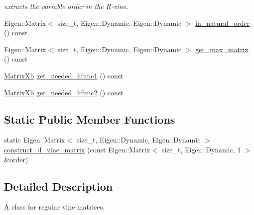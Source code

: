 \begin{DoxyCompactItemize}
\begin{DoxyCompactList}\small\item\em extracts the variable order in the R-\/vine. \end{DoxyCompactList}\item 
Eigen\+::\+Matrix$<$ size\+\_\+t, Eigen\+::\+Dynamic, Eigen\+::\+Dynamic $>$ \hyperlink{classvinecopulib_1_1_r_vine_matrix_a4e63d8b01e1d89284ca28192676b8a3f}{in\+\_\+natural\+\_\+order} () const 
\item 
Eigen\+::\+Matrix$<$ size\+\_\+t, Eigen\+::\+Dynamic, Eigen\+::\+Dynamic $>$ \hyperlink{classvinecopulib_1_1_r_vine_matrix_aef8bbe14451d023e1c9c113e3812f574}{get\+\_\+max\+\_\+matrix} () const 
\item 
\hyperlink{namespacetools__eigen_ad496806a2d02c8e881330d95e0c150aa}{Matrix\+Xb} \hyperlink{classvinecopulib_1_1_r_vine_matrix_a6303fc1f643fdf793c867ca7e08e42bc}{get\+\_\+needed\+\_\+hfunc1} () const 
\item 
\hyperlink{namespacetools__eigen_ad496806a2d02c8e881330d95e0c150aa}{Matrix\+Xb} \hyperlink{classvinecopulib_1_1_r_vine_matrix_a7ac32cf10a966ba567142e9b36106746}{get\+\_\+needed\+\_\+hfunc2} () const 
\end{DoxyCompactItemize}
\subsection*{Static Public Member Functions}
\begin{DoxyCompactItemize}
\item 
static Eigen\+::\+Matrix$<$ size\+\_\+t, Eigen\+::\+Dynamic, Eigen\+::\+Dynamic $>$ \hyperlink{classvinecopulib_1_1_r_vine_matrix_ad523b84e2ea41eba4eb982eb9b39471b}{construct\+\_\+d\+\_\+vine\+\_\+matrix} (const Eigen\+::\+Matrix$<$ size\+\_\+t, Eigen\+::\+Dynamic, 1 $>$ \&order)
\end{DoxyCompactItemize}


\subsection{Detailed Description}
A class for regular vine matrices. 

